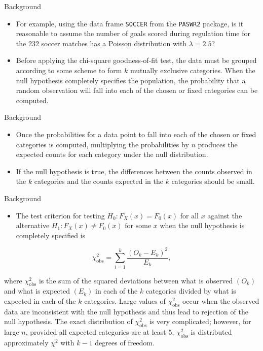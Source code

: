 \documentclass[
  ignorenonframetext,
]{beamer}
\providecommand{\tightlist}{%
  \setlength{\itemsep}{0pt}\setlength{\parskip}{0pt}}
\begin{document}
\begin{frame}[fragile]{Background}
\protect\hypertarget{background-2}{}
\begin{itemize}
\item
  For example, using the data frame \texttt{SOCCER} from the
  \texttt{PASWR2} package, is it reasonable to assume the number of
  goals scored during regulation time for the 232 soccer matches has a
  Poisson distribution with \(\lambda=2.5\)?
\item
  Before applying the chi-square goodness-of-fit test, the data must be
  grouped according to some scheme to form \(k\) mutually exclusive
  categories. When the null hypothesis completely specifies the
  population, the probability that a random observation will fall into
  each of the chosen or fixed categories can be computed.
\end{itemize}
\end{frame}

\begin{frame}{Background}
\protect\hypertarget{background-3}{}
\begin{itemize}
\item
  Once the probabilities for a data point to fall into each of the
  chosen or fixed categories is computed, multiplying the probabilities
  by \(n\) produces the expected counts for each category under the null
  distribution.
\item
  If the null hypothesis is true, the differences between the counts
  observed in the \(k\) categories and the counts expected in the \(k\)
  categories should be small.
\end{itemize}
\end{frame}

\begin{frame}{Background}
\protect\hypertarget{background-4}{}
\begin{itemize}
\tightlist
\item
  The test criterion for testing
  \(H_0: F_X(x) = F_0(x) \text{ for all } x\) against the alternative
  \(H_1: F_X(x) \ne F_0(x) \text{ for some } x\) when the null
  hypothesis is completely specified is
\end{itemize}

\begin{equation}
\chi_{\text{obs}}^2=\sum_{i=1}^{k} \frac{(O_k - E_k)^2}{E_k},
\end{equation}

where \(\chi_\text{obs}^2\) is the sum of the squared deviations between
what is observed \((O_k)\) and what is expected \((E_k)\) in each of the
\(k\) categories divided by what is expected in each of the \(k\)
categories. Large values of \(\chi_\text{obs}^2\) occur when the
observed data are inconsistent with the null hypothesis and thus lead to
rejection of the null hypothesis. The exact distribution of
\(\chi_\text{obs}^2\) is very complicated; however, for large \(n\),
provided all expected categories are at least 5, \(\chi_\text{obs}^2\)
is distributed approximately \(\chi^2\) with \(k-1\) degrees of freedom.
\end{frame}
\end{document}
